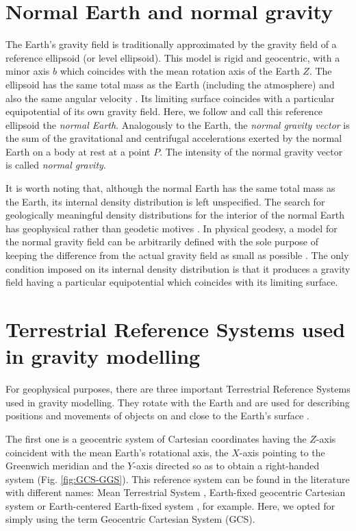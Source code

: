 \documentclass[extra]{gji}
\begin{document}
\section{Normal Earth and normal gravity}

The Earth's gravity field is traditionally approximated
by the gravity field of a reference ellipsoid (or level ellipsoid).
This model is rigid and geocentric,
with a minor axis $b$ which coincides with
the mean rotation axis of the Earth $Z$.
The ellipsoid has the same total mass as the Earth (including the atmosphere)
and also the same angular velocity \citep{heiskanen-moritz1967,
vanicek1987,hofmann-wellenhof-moritz2005,torge2012}.
Its limiting surface coincides with
a particular equipotential of its own gravity field.
Here, we follow \citep{torge2012} and call this reference ellipsoid
the \textit{normal Earth}.
Analogously to the Earth, the \textit{normal gravity vector} is
the sum of the
gravitational and centrifugal accelerations exerted by the normal
Earth on a body at rest at a point $P$.
The intensity of the normal gravity vector is called \textit{normal gravity}.

It is worth noting that, although the normal Earth has the same total mass as
the Earth, its internal density distribution is left unspecified.
The search for geologically meaningful density distributions
for the interior of the normal Earth has
geophysical rather than geodetic motives \citep{marussi1974}.
In physical geodesy, a model for the normal gravity field
can be arbitrarily defined with the sole purpose of
keeping the difference from the actual gravity field
as small as possible \citep{vanicek1987}.
The only condition imposed on its internal density
distribution is that it produces a gravity field
having a particular equipotential which coincides
with its limiting surface.


\section{Terrestrial Reference Systems used in gravity modelling}

For geophysical purposes, there are three important Terrestrial Reference Systems used in gravity modelling.
They rotate with the Earth and are used for describing
positions and movements of objects on and close to the Earth’s surface
\citep{torge2012}.

The first one is a geocentric system of Cartesian coordinates having
the $Z$-axis coincident with the mean Earth's rotational axis,
the $X$-axis pointing to the Greenwich meridian and the $Y$-axis
directed so as to obtain a right-handed system (Fig. \ref{fig:GCS-GGS}).
This reference system can be found in the literature with different names: Mean Terrestrial System \citep[e.g.,][]{soler1976}, Earth-fixed geocentric Cartesian system \citep[e.g.,][]{torge2012}
or Earth-centered Earth-fixed system \citep[e.g.,][]{bouman_etal2013}, for example. Here, we opted for simply using the term Geocentric Cartesian System (GCS).
\end{document}
